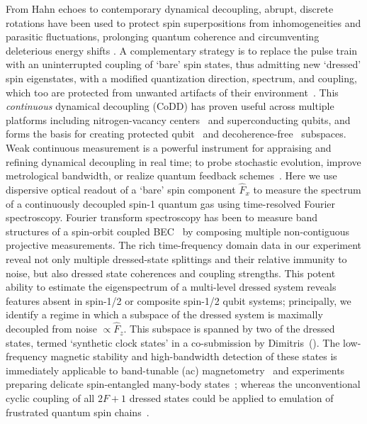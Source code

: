 \documentclass[aps,prl,reprint,superscriptaddress,floatfix]{revtex4-1}
\begin{document}
From Hahn echoes to contemporary dynamical decoupling, abrupt, discrete rotations have been used to protect spin superpositions from inhomogeneities and parasitic fluctuations, prolonging quantum coherence and circumventing deleterious energy shifts \cite{biercuk_optimized_2009,lange_universal_2010,bluhm_dephasing_2011}.
A complementary strategy is to replace the pulse train with an uninterrupted coupling of `bare' spin states, thus admitting new `dressed' spin eigenstates, with a modified quantization direction, spectrum, and coupling, which too are protected from unwanted artifacts of their environment~\cite{fanchini_continuously_2007}.
This \textit{continuous} dynamical decoupling (CoDD) has proven useful across multiple platforms including nitrogen-vacancy centers~\cite{hirose_continuous_2012,loretz_radio-frequency_2013,cai_robust_2012,*cai_long-lived_2012,golter_protecting_2014} and superconducting qubits, and forms the basis for creating protected qubit~\cite{aharon_general_2013} and decoherence-free~\cite{facchi_quantum_2002,*facchi_unification_2004} subspaces.
Weak continuous measurement is a powerful instrument for appraising and refining dynamical decoupling in real time; to probe stochastic evolution, improve metrological bandwidth, or realize quantum feedback schemes~\cite{vijay_stabilizing_2012}.
Here we use dispersive optical readout of a `bare' spin component $\hat{F}_x$ to measure the spectrum of a continuously decoupled spin-1 quantum gas using time-resolved Fourier spectroscopy. 
Fourier transform spectroscopy has been to measure band structures of a spin-orbit coupled BEC~\cite{valdes-curiel_fourier_2017} by composing multiple non-contiguous projective measurements.
The rich time-frequency domain data in our experiment reveal not only multiple dressed-state splittings and their relative immunity to noise, but also dressed state coherences and coupling strengths.
This potent ability to estimate the eigenspectrum of a multi-level dressed system reveals features absent in spin-1/2 or composite spin-1/2 qubit systems; principally, we identify a regime in which a subspace of the dressed system is maximally decoupled from noise $\propto \hat{F}_z$.
This subspace is spanned by two of the dressed states, termed `synthetic clock states' in a co-submission by Dimitris~\etal (\dimitris).
The low-frequency magnetic stability and high-bandwidth detection of these states is immediately applicable to band-tunable (ac) magnetometry~\cite{hirose_continuous_2012,loretz_radio-frequency_2013,ockeloen_quantum_2013,*horsley_frequency-tunable_2016} and experiments preparing delicate spin-entangled many-body states~\cite{stamper-kurn_spinor_2013}; whereas the unconventional cyclic coupling of all $2F+1$ dressed states could be applied to emulation of frustrated quantum spin chains~\cite{mikeska_one-dimensional_2004}.
\end{document}

